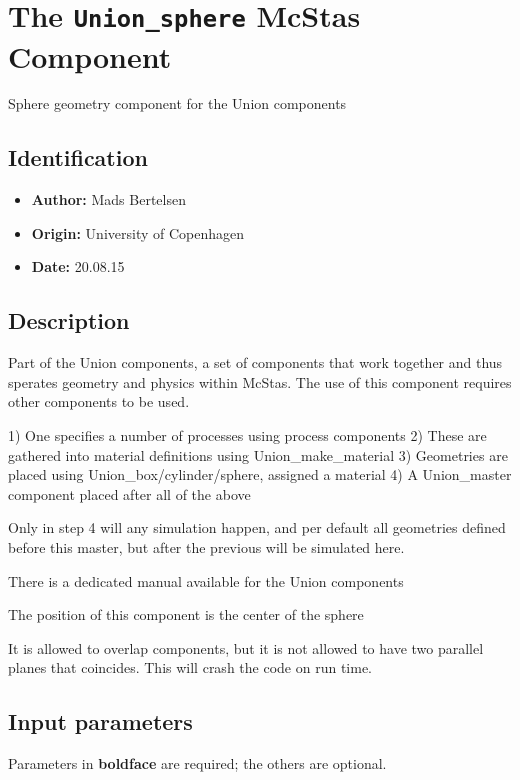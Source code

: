 \section{The \texttt{Union\_sphere} McStas Component}
Sphere geometry component for the Union components

\subsection*{Identification}
\begin{itemize}
  \item \textbf{Author:} Mads Bertelsen
  \item \textbf{Origin:} University of Copenhagen
  \item \textbf{Date:} 20.08.15
\end{itemize}

\subsection*{Description}
Part of the Union components, a set of components that work together and thus sperates geometry and physics within McStas. The use of this component requires other components to be used.

1) One specifies a number of processes using process components 2) These are gathered into material definitions using Union\_make\_material 3) Geometries are placed using Union\_box/cylinder/sphere, assigned a material 4) A Union\_master component placed after all of the above

Only in step 4 will any simulation happen, and per default all geometries defined before this master, but after the previous will be simulated here.

There is a dedicated manual available for the Union components

The position of this component is the center of the sphere

It is allowed to overlap components, but it is not allowed to have two parallel planes that coincides. This will crash the code on run time.

\subsection*{Input parameters}
Parameters in \textbf{boldface} are required; the others are optional.

